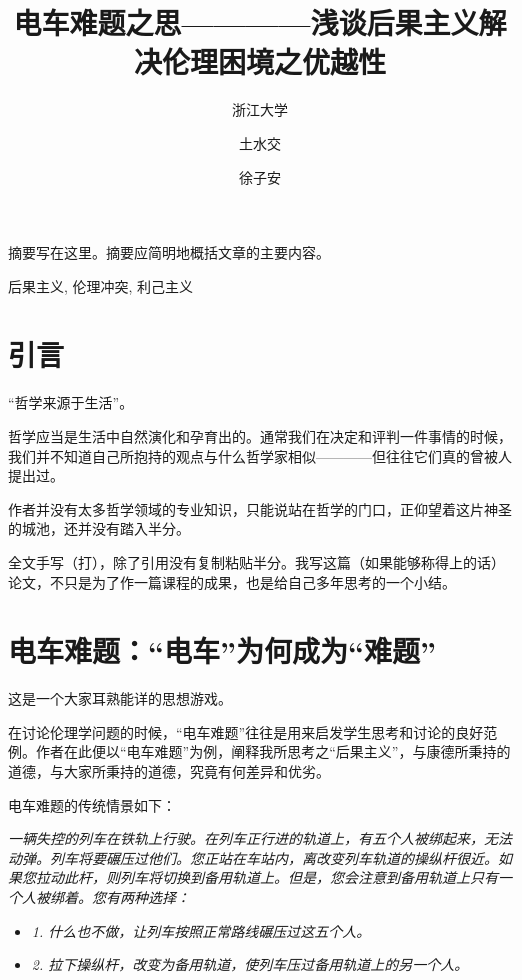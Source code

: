 \documentclass[10pt]{article}
\title{电车难题之思————浅谈后果主义解决伦理困境之优越性}
\author{浙江大学 \and 土水交 \and 徐子安}
\begin{document}
\maketitle

\abstract
摘要写在这里。摘要应简明地概括文章的主要内容。

\keywords 后果主义, 伦理冲突, 利己主义

\section{引言}
      “哲学来源于生活”。
   
      哲学应当是生活中自然演化和孕育出的。通常我们在决定和评判一件事情的时候，我们并不知道自己所抱持的观点与什么哲学家相似————但往往它们真的曾被人提出过。
     
    作者并没有太多哲学领域的专业知识，只能说站在哲学的门口，正仰望着这片神圣的城池，还并没有踏入半分。

  全文手写（打），除了引用没有复制粘贴半分。我写这篇（如果能够称得上的话）论文，不只是为了作一篇课程的成果，也是给自己多年思考的一个小结。

\section{电车难题：“电车”为何成为“难题”}
    这是一个大家耳熟能详的思想游戏。

      在讨论伦理学问题的时候，“电车难题”往往是用来启发学生思考和讨论的良好范例。作者在此便以“电车难题”为例，阐释我所思考之“后果主义”，与康德所秉持的道德，与大家所秉持的道德，究竟有何差异和优劣。
      
      电车难题的传统情景如下：
      

\emph{
 一辆失控的列车在铁轨上行驶。在列车正行进的轨道上，有五个人被绑起来，无法动弹。列车将要碾压过他们。您正站在车站内，离改变列车轨道的操纵杆很近。如果您拉动此杆，则列车将切换到备用轨道上。但是，您会注意到备用轨道上只有一个人被绑着。您有两种选择：
 }
    \begin{itemize}
        \item \emph{1. 什么也不做，让列车按照正常路线碾压过这五个人。}
        \item \emph{2. 拉下操纵杆，改变为备用轨道，使列车压过备用轨道上的另一个人。}
        \end{itemize}
\end{document}
